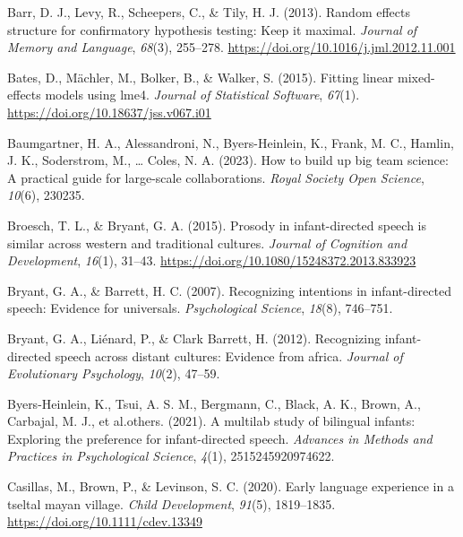 \documentclass[
  ,man,floatsintext]{apa6}
\newlength{\cslhangindent}
\newlength{\cslentryspacingunit} %
\newenvironment{CSLReferences}[2] %
 {%
  \setlength{\parindent}{0pt}
  \ifodd #1
  \let\oldpar\par
  \def\par{\hangindent=\cslhangindent\oldpar}
  \fi
  \setlength{\parskip}{#2\cslentryspacingunit}
 }%
 {}
\begin{document}
\hypertarget{refs}{}
\begin{CSLReferences}{1}{0}
\leavevmode{}%
Barr, D. J., Levy, R., Scheepers, C., \& Tily, H. J. (2013). Random effects structure for confirmatory hypothesis testing: Keep it maximal. \emph{Journal of Memory and Language}, \emph{68}(3), 255--278. \url{https://doi.org/10.1016/j.jml.2012.11.001}

\leavevmode{}%
Bates, D., Mächler, M., Bolker, B., \& Walker, S. (2015). Fitting linear mixed-effects models using lme4. \emph{Journal of Statistical Software}, \emph{67}(1). \url{https://doi.org/10.18637/jss.v067.i01}

\leavevmode{}%
Baumgartner, H. A., Alessandroni, N., Byers-Heinlein, K., Frank, M. C., Hamlin, J. K., Soderstrom, M., \ldots{} Coles, N. A. (2023). How to build up big team science: A practical guide for large-scale collaborations. \emph{Royal Society Open Science}, \emph{10}(6), 230235.

\leavevmode{}%
Broesch, T. L., \& Bryant, G. A. (2015). Prosody in infant-directed speech is similar across western and traditional cultures. \emph{Journal of Cognition and Development}, \emph{16}(1), 31--43. \url{https://doi.org/10.1080/15248372.2013.833923}

\leavevmode{}%
Bryant, G. A., \& Barrett, H. C. (2007). Recognizing intentions in infant-directed speech: Evidence for universals. \emph{Psychological Science}, \emph{18}(8), 746--751.

\leavevmode{}%
Bryant, G. A., Liénard, P., \& Clark Barrett, H. (2012). Recognizing infant-directed speech across distant cultures: Evidence from africa. \emph{Journal of Evolutionary Psychology}, \emph{10}(2), 47--59.

\leavevmode{}%
Byers-Heinlein, K., Tsui, A. S. M., Bergmann, C., Black, A. K., Brown, A., Carbajal, M. J., et al.others. (2021). A multilab study of bilingual infants: Exploring the preference for infant-directed speech. \emph{Advances in Methods and Practices in Psychological Science}, \emph{4}(1), 2515245920974622.

\leavevmode{}%
Casillas, M., Brown, P., \& Levinson, S. C. (2020). Early language experience in a tseltal mayan village. \emph{Child Development}, \emph{91}(5), 1819--1835. \url{https://doi.org/10.1111/cdev.13349}


\end{CSLReferences}
\end{document}

